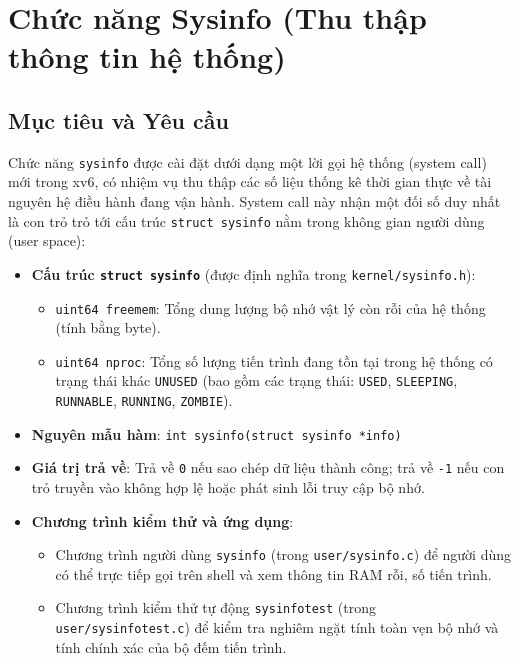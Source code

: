 \section{Chức năng Sysinfo (Thu thập thông tin hệ thống)}

\subsection{Mục tiêu và Yêu cầu}
Chức năng \texttt{sysinfo} được cài đặt dưới dạng một lời gọi hệ thống (system call) mới trong xv6, có nhiệm vụ thu thập các số liệu thống kê thời gian thực về tài nguyên hệ điều hành đang vận hành. System call này nhận một đối số duy nhất là con trỏ trỏ tới cấu trúc \texttt{struct sysinfo} nằm trong không gian người dùng (user space):
\begin{itemize}
    \item \textbf{Cấu trúc \texttt{struct sysinfo}} (được định nghĩa trong \texttt{kernel/sysinfo.h}):
    \begin{itemize}
        \item \texttt{uint64 freemem}: Tổng dung lượng bộ nhớ vật lý còn rỗi của hệ thống (tính bằng byte).
        \item \texttt{uint64 nproc}: Tổng số lượng tiến trình đang tồn tại trong hệ thống có trạng thái khác \texttt{UNUSED} (bao gồm các trạng thái: \texttt{USED}, \texttt{SLEEPING}, \texttt{RUNNABLE}, \texttt{RUNNING}, \texttt{ZOMBIE}).
    \end{itemize}
    \item \textbf{Nguyên mẫu hàm}: \texttt{int sysinfo(struct sysinfo *info)}
    \item \textbf{Giá trị trả về}: Trả về \texttt{0} nếu sao chép dữ liệu thành công; trả về \texttt{-1} nếu con trỏ truyền vào không hợp lệ hoặc phát sinh lỗi truy cập bộ nhớ.
    \item \textbf{Chương trình kiểm thử và ứng dụng}:
    \begin{itemize}
        \item Chương trình người dùng \texttt{sysinfo} (trong \texttt{user/sysinfo.c}) để người dùng có thể trực tiếp gọi trên shell và xem thông tin RAM rỗi, số tiến trình.
        \item Chương trình kiểm thử tự động \texttt{sysinfotest} (trong \texttt{user/sysinfotest.c}) để kiểm tra nghiêm ngặt tính toàn vẹn bộ nhớ và tính chính xác của bộ đếm tiến trình.
    \end{itemize}
\end{itemize}

